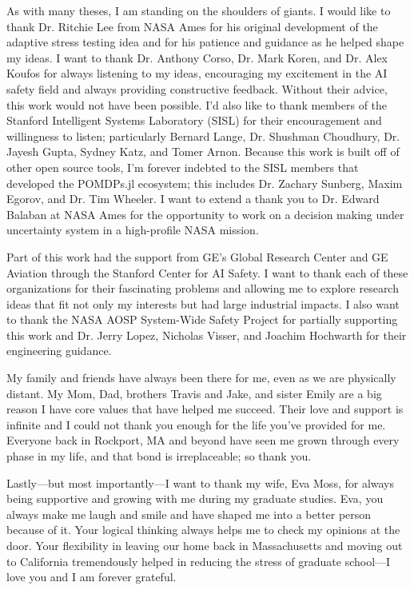 As with many theses, I am standing on the shoulders of giants.
I would like to thank Dr. Ritchie Lee from NASA Ames for his original development of the adaptive stress testing idea and for his patience and guidance as he helped shape my ideas.
I want to thank Dr. Anthony Corso, Dr. Mark Koren, and Dr. Alex Koufos for always listening to my ideas, encouraging my excitement in the AI safety field and always providing constructive feedback. Without their advice, this work would not have been possible.
I'd also like to thank members of the Stanford Intelligent Systems Laboratory (SISL) for their encouragement and willingness to listen; particularly Bernard Lange, Dr. Shushman Choudhury, Dr. Jayesh Gupta, Sydney Katz, and Tomer Arnon.
Because this work is built off of other open source tools, I'm forever indebted to the SISL members that developed the POMDPs.jl ecosystem; this includes Dr. Zachary Sunberg, Maxim Egorov, and Dr. Tim Wheeler.
I want to extend a thank you to Dr. Edward Balaban at NASA Ames for the opportunity to work on a decision making under uncertainty system in a high-profile NASA mission.

Part of this work had the support from GE's Global Research Center and GE Aviation through the Stanford Center for AI Safety.
I want to thank each of these organizations for their fascinating problems and allowing me to explore research ideas that fit not only my interests but had large industrial impacts.
I also want to thank the NASA AOSP System-Wide Safety Project for partially supporting this work and Dr. Jerry Lopez, Nicholas Visser, and Joachim Hochwarth for their engineering guidance.

My family and friends have always been there for me, even as we are physically distant.
My Mom, Dad, brothers Travis and Jake, and sister Emily are a big reason I have core values that have helped me succeed.
Their love and support is infinite and I could not thank you enough for the life you've provided for me.
Everyone back in Rockport, MA and beyond have seen me grown through every phase in my life, and that bond is irreplaceable; so thank you.

Lastly---but most importantly---I want to thank my wife, Eva Moss, for always being supportive and growing with me during my graduate studies.
Eva, you always make me laugh and smile and have shaped me into a better person because of it.
Your logical thinking always helps me to check my opinions at the door.
Your flexibility in leaving our home back in Massachusetts and moving out to California tremendously helped in reducing the stress of graduate school---I love you and I am forever grateful.